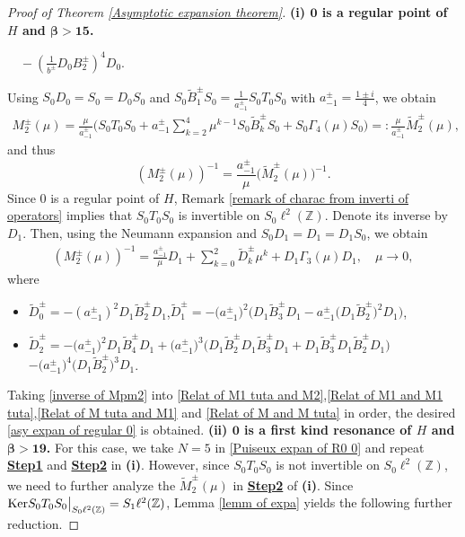 \documentclass[reqno, 11pt]{amsart}
\newcommand\Z{\mathbb{Z}}
\numberwithin{equation}{section}
\begin{document}
\begin{proof}[Proof of Theorem {\rm\ref{Asymptotic expansion theorem}}]{\bf{(i) ${\bm{0}}$ is a regular point of $H$ and {$\bm{\beta>15}$}.}}
\begin{itemize}
$\quad-\left(\frac{1}{b^{\pm}}D_0B^{\pm}_2\right)^4D_0$.
\end{itemize}
Using $S_0D_0=S_0=D_0S_0$ and $S_0\widetilde{B}_{1}^{\pm}S_0=\frac{1}{a^{\pm}_{-1}}S_0T_0S_0$ with $a^{\pm}_{-1}=\frac{1\pm i}{4}$, we obtain
\begin{align*}
M^{\pm}_2(\mu)=\frac{\mu}{a^{\pm}_{-1}}\Big(S_0T_0S_0+a^{\pm}_{-1}\sum\limits_{k=2}^{4}\mu^{k-1}S_0\widetilde{B}_{k}^{\pm}S_0+S_0\Gamma_4(\mu)S_0\Big)=:\frac{\mu}{a^{\pm}_{-1}}\widetilde{M}^{\pm}_2(\mu),
\end{align*}
and thus
\begin{equation}\label{Relat of M2 and M2 tuta}
\left(M^{\pm}_2(\mu)\right)^{-1}=\frac{a^{\pm}_{-1}}{\mu}\big(\widetilde{M}_{2}^{\pm}(\mu)\big)^{-1}.
\end{equation}
Since $0$ is a regular point of $H$, Remark \ref{remark of charac from inverti of operators} implies that $S_0T_0S_0$ is invertible on $S_0\ell^2(\Z)$. Denote its inverse by $D_1$. Then, using the Neumann expansion and $S_0D_1=D_1=D_1S_0$, we obtain
\begin{align}\label{inverse of Mpm2}
\left(M^{\pm}_2(\mu)\right)^{-1}=\frac{a^{\pm}_{-1}}{\mu}D_1+\sum\limits_{k=0}^{2}\widetilde{D}^{\pm}_k\mu^k+D_1\Gamma_3(\mu)D_1,\quad\mu\rightarrow0,
\end{align}
where
\begin{itemize}
\item
$\widetilde{D}^{\pm}_0=-\left(a^{\pm}_{-1}\right)^2D_1\widetilde{B}_{2}^{\pm}D_1$,\quad $\widetilde{D}^{\pm}_{1}=-\big(a^{\pm}_{-1}\big)^2\big(D_1\widetilde{B}_{3}^{\pm}D_1-a^{\pm}_{-1}\big(D_1\widetilde{B}_{2}^{\pm}\big)^2D_1\big)$,
\vskip0.2cm
\item $\widetilde{D}^{\pm}_2=-\big(a^{\pm}_{-1}\big)^2D_1\widetilde{B}_{4}^{\pm}D_1+\big(a^{\pm}_{-1}\big)^3\big(D_1\widetilde{B}_{2}^{\pm}D_1\widetilde{B}_{3}^{\pm}D_1+D_1\widetilde{B}_{3}^{\pm}D_1\widetilde{B}_{2}^{\pm}D_1\big)$
    $-\big(a^{\pm}_{-1}\big)^4\big(D_1\widetilde{B}_{2}^{\pm}\big)^3D_1$.
\end{itemize}
Taking \eqref{inverse of Mpm2} into \eqref{Relat of M1 tuta and M2},\eqref{Relat of M1 and M1 tuta},\eqref{Relat of M tuta and M1} and \eqref{Relat of M and M tuta} in order, the desired \eqref{asy expan of regular 0} is obtained.
\vskip0.2cm
{\bf{(ii) ${\bm{0}}$ is a first kind resonance of $H$ and {$\bm{\beta>19}$}.}} For this case, we take $N=5$ in \eqref{Puiseux expan of R0 0} and repeat {\bf{\underline{Step1}}} and  {\bf{\underline{Step2}}} in {\bf{(i)}}. However, since $S_0T_0S_0$ is not invertible on $S_0\ell^2(\Z)$, we need to further analyze the $\widetilde{M}^{\pm}_2(\mu)$ in {\bf{\underline{Step2}}} of {\bf{(i)}}. Since ${\rm Ker}S_0T_0S_0\big|_{S_0\ell^2(\Z)}=S_1\ell^2(\Z)$, Lemma \ref{lemm of expa} yields the following further reduction.

\end{proof}
\end{document}
